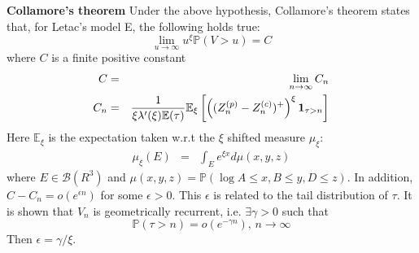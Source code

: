 \documentclass[12pt]{article}
\newcommand{\E}{
        \mathbb{E}
}
\newcommand{\p}{
        \mathbb{P}
}
\newcommand{\I}[1]{
        \mathbf 1_{#1}
}
\begin{document}
{\bf Collamore's theorem}
Under the above hypothesis, Collamore's theorem states that, for
Letac's model E, the following holds true:
\[
\lim_{u \to \infty} u^\xi \p(V > u) = C
\]
where $C$ is a finite positive constant
\begin{eqnarray*}
  C &=& \lim_{n \to \infty} C_n \\
  C_n &=&     {1 \over \xi \lambda'(\xi) \E(\tau)}
    \E_\xi \left[
    \left(
    (Z^{(p)}_n - Z^{(c)}_n)^+
    \right)^\xi \I{\tau > n}
    \right]
\end{eqnarray*}
Here $\E_{\xi}$ is the expectation taken w.r.t the $\xi$ shifted
measure $\mu_\xi$:
\begin{eqnarray*}
  \mu_\xi(E) &=& \int_E e^{\xi x} d\mu(x, y, z)
\end{eqnarray*}
where $E \in \mathcal B(R^3)$ and $\mu(x, y, z) = \p(\log A \leq x, B
\leq y, D \leq z)$. In addition, $C - C_n = o(e^{\epsilon n})$ for
some $\epsilon > 0$. This $\epsilon$ is related to the tail
distribution of $\tau$. It is shown that $V_n$ is geometrically
recurrent, i.e. $\exists \gamma > 0$ such that
\[
\p(\tau > n) = o(e^{-\gamma n}) \text{, } n \to \infty
\]
Then $\epsilon = \gamma/\xi$.
\end{document}
